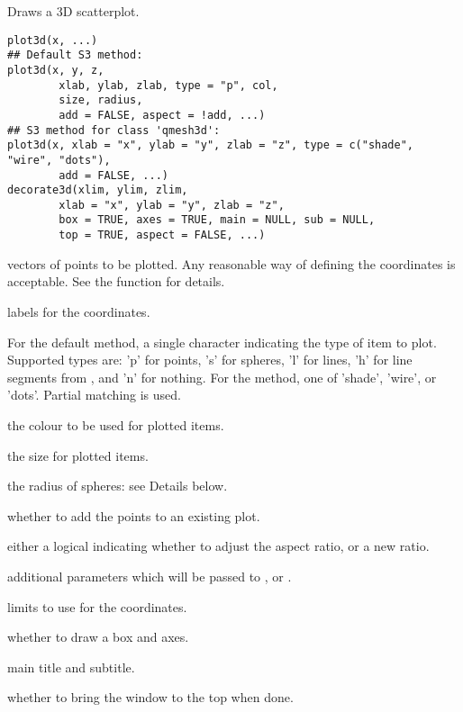 \documentclass{article}
\begin{document}
\begin{Description}\relax
Draws a 3D scatterplot.
\end{Description}
\begin{Usage}
\begin{verbatim}
plot3d(x, ...)
## Default S3 method:
plot3d(x, y, z,  
        xlab, ylab, zlab, type = "p", col,  
        size, radius,
        add = FALSE, aspect = !add, ...)
## S3 method for class 'qmesh3d':
plot3d(x, xlab = "x", ylab = "y", zlab = "z", type = c("shade", "wire", "dots"),
        add = FALSE, ...)       
decorate3d(xlim, ylim, zlim, 
        xlab = "x", ylab = "y", zlab = "z", 
        box = TRUE, axes = TRUE, main = NULL, sub = NULL,
        top = TRUE, aspect = FALSE, ...)
\end{verbatim}
\end{Usage}
\begin{Arguments}
\begin{ldescription}
\item[\code{x, y, z}] vectors of points to be plotted. Any reasonable way of defining the
coordinates is acceptable.  See the function 
for details.
\item[\code{xlab, ylab, zlab}] labels for the coordinates.
\item[\code{type}] For the default method, a single character indicating the type of item to plot.  
Supported types are: 'p' for points, 's' for spheres, 
'l' for lines, 'h' for line segments 
from , and 'n' for nothing.  For the  method, one of 
'shade', 'wire', or 'dots'.  Partial matching is used.

\item[\code{col}] the colour to be used for plotted items.
\item[\code{size}] the size for plotted items.
\item[\code{radius}] the radius of spheres:  see Details below.
\item[\code{add}] whether to add the points to an existing plot.
\item[\code{aspect}] either a logical indicating whether to adjust the aspect ratio, or a new ratio.
\item[\code{...}] additional parameters which will be passed to , 
or .
\item[\code{xlim, ylim, zlim}] limits to use for the coordinates.
\item[\code{box, axes}] whether to draw a box and axes.
\item[\code{main, sub}] main title and subtitle.
\item[\code{top}] whether to bring the window to the top when done.
\end{ldescription}
\end{Arguments}
\end{document}
